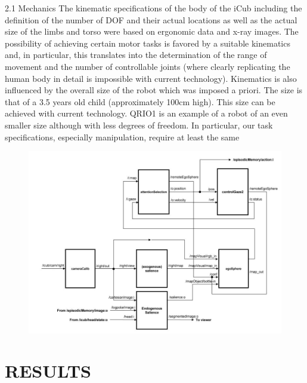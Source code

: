\documentclass[a4paper, 12pt]{report}
\begin{document}
2.1 Mechanics
The kinematic specifications of the body of the iCub including the definition 
of the number of DOF and their actual locations as well as the actual size of 
the limbs and torso were based on ergonomic data and x-ray images.
The possibility of achieving certain motor tasks is favored by a suitable 
kinematics and, in particular, this translates into the determination of the 
range of movement and the number of controllable joints (where clearly 
replicating the human body in detail is impossible with current technology). 
Kinematics is also influenced by the overall size of the robot which was 
imposed a priori. The size is that of a 3.5 years old child (approximately 
100cm high). This size can be achieved with current technology. QRIO1 is an 
example of a robot of an even smaller size although with less degrees of 
freedom. In particular, our task specifications, especially manipulation, 
require at least the same


\begin{figure}[h!]
\centering
\includegraphics[width=0.9\linewidth]{cognitive_architecture_A}
\caption{}
\label{fig:cognitive_architecture_A}
\end{figure}


\chapter{RESULTS}


\end{document}

